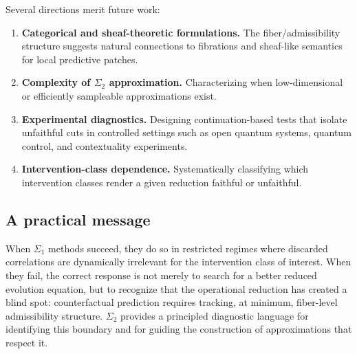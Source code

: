 Several directions merit future work:
\begin{enumerate}
  \item \textbf{Categorical and sheaf-theoretic formulations.} The fiber/admissibility structure
        suggests natural connections to fibrations and sheaf-like semantics for local predictive
        patches.
  \item \textbf{Complexity of $\Sigma_2$ approximation.} Characterizing when low-dimensional or
        efficiently sampleable approximations exist.
  \item \textbf{Experimental diagnostics.} Designing continuation-based tests that isolate
        unfaithful cuts in controlled settings such as open quantum systems, quantum control,
        and contextuality experiments.
  \item \textbf{Intervention-class dependence.} Systematically classifying which intervention
        classes render a given reduction faithful or unfaithful.
\end{enumerate}

\subsection{A practical message}

When $\Sigma_1$ methods succeed, they do so in restricted regimes where discarded correlations
are dynamically irrelevant for the intervention class of interest. When they fail, the correct
response is not merely to search for a better reduced evolution equation, but to recognize that
the operational reduction has created a blind spot: counterfactual prediction requires tracking,
at minimum, fiber-level admissibility structure. $\Sigma_2$ provides a principled diagnostic
language for identifying this boundary and for guiding the construction of approximations that
respect it.